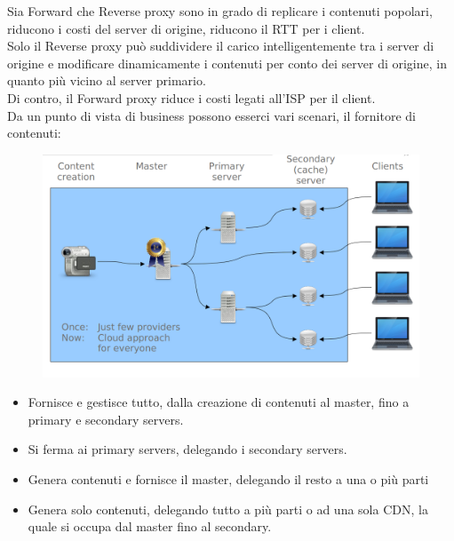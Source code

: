 \documentclass{article}
\begin{document}
		Sia Forward che	Reverse proxy sono in grado di replicare i contenuti popolari, riducono i costi del server di origine, riducono il RTT per i client.\\
		Solo il Reverse proxy può suddividere il carico intelligentemente tra i server di origine e modificare dinamicamente i contenuti per conto dei server di origine, in quanto più vicino al server primario.\\
		Di contro, il Forward proxy riduce i costi legati all'ISP per il client.\\
		
		Da un punto di vista di business possono esserci vari scenari, il fornitore di contenuti:
		\begin{figure}[ht]
			\centering
			\includegraphics[width=0.7\linewidth]{SAC_A5_contentprovider}
			\label{fig:saca5contentprovider}
		\end{figure}
		
		\begin{itemize}
		    \item Fornisce e gestisce tutto, dalla creazione di contenuti al master, fino a primary e secondary servers.
		    \item Si ferma ai primary servers, delegando i secondary servers.
		    \item Genera contenuti e fornisce il master, delegando il resto a una o più parti
		    \item Genera solo contenuti, delegando tutto a più parti o ad una sola CDN, la quale si occupa dal master fino al secondary.
		\end{itemize}
		
\end{document}
